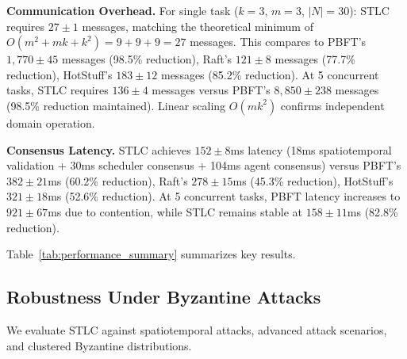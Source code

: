 \documentclass[lettersize,journal]{IEEEtran}
\newlength{\tblwidth}
\begin{document}
\textbf{Communication Overhead.} For single task ($k=3$, $m=3$, $|N|=30$): 
STLC requires $27 \pm 1$ messages, matching the theoretical minimum of 
$O(m^2 + mk + k^2) = 9 + 9 + 9 = 27$ messages. This compares to PBFT's 
$1,770 \pm 45$ messages (98.5\% reduction), Raft's $121 \pm 8$ messages 
(77.7\% reduction), HotStuff's $183 \pm 12$ messages (85.2\% reduction). At 5 concurrent tasks, STLC requires $136 \pm 4$ 
messages versus PBFT's $8,850 \pm 238$ messages (98.5\% reduction 
maintained). Linear scaling $O(mk^2)$ confirms independent domain operation.

\textbf{Consensus Latency.} STLC achieves $152 \pm 8$ms latency (18ms 
spatiotemporal validation + 30ms scheduler consensus + 104ms agent 
consensus) versus PBFT's $382 \pm 21$ms (60.2\% reduction), Raft's 
$278 \pm 15$ms (45.3\% reduction), HotStuff's $321 \pm 18$ms (52.6\% 
reduction). At 5 concurrent tasks, PBFT latency increases to 
$921 \pm 67$ms due to contention, while STLC remains stable at 
$158 \pm 11$ms (82.8\% reduction).

Table~\ref{tab:performance_summary} summarizes key results.

\begin{table}[h]
\centering
\caption{Performance Summary ($k=3$, $m=3$, $|N|=30$, Single Task)}
\label{tab:performance_summary}
\small
{}
\end{table}

\subsection{Robustness Under Byzantine Attacks}

We evaluate STLC against spatiotemporal attacks, advanced attack scenarios, 
and clustered Byzantine distributions.
\end{document}

